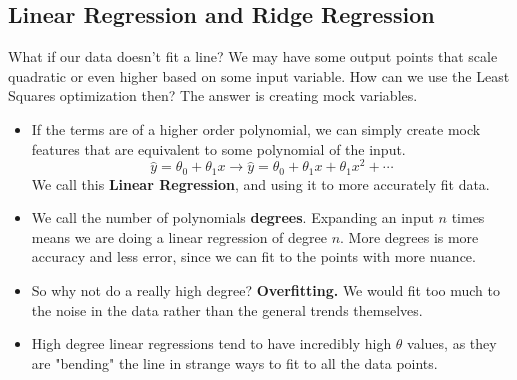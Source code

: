 \documentclass{article}
\begin{document}
\subsection{Linear Regression and Ridge Regression}
What if our data doesn't fit a line?  We may have some output points that scale quadratic or even higher based on some input variable. How can we use the Least Squares optimization then? The answer is creating mock variables. 
\begin{itemize}
    \item If the terms are of a higher order polynomial, we can simply create mock features that are equivalent to some polynomial of the input.
    $$\hat{y} = \theta_0 + \theta_1x \longrightarrow \hat{y} = \theta_0 + \theta_1x + \theta_1x^2 + \cdots$$
    We call this \textbf{Linear Regression}, and using it to more accurately fit data.
    
    \item We call the number of polynomials \textbf{degrees}. Expanding an input $n$ times means we are doing a linear regression of degree $n$. More degrees is more accuracy and less error, since we can fit to the points with more nuance.
    
    \item So why not do a really high degree? \textbf{Overfitting.} We would fit too much to the noise in the data rather than the general trends themselves. 
    \item High degree linear regressions tend to have incredibly high $\theta$ values, as they are "bending" the line in strange ways to fit to all the data points.
\end{itemize}
\end{document}

